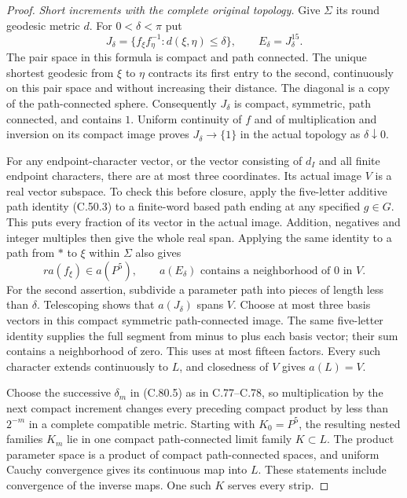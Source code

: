 \begin{proof}
\emph{Short increments with the complete original topology.}
Give $\Sigma$ its round geodesic metric $d$.
For $0<\delta<\pi$ put
\[
 J_\delta=
 \{f_\xi f_\eta^{-1}:d(\xi,\eta)\leq\delta\},
 \qquad E_\delta=J_\delta^{15}.
                                                               \tag{C.80.5}
\]
The pair space in this formula is compact and
path connected. The unique shortest geodesic
from $\xi$ to $\eta$ contracts its first entry
to the second, continuously on this pair space
and without increasing their distance. The
diagonal is a copy of the path-connected sphere.
Consequently $J_\delta$ is compact, symmetric,
path connected, and contains $1$. Uniform
continuity of $f$ and of multiplication and
inversion on its compact image proves
$J_\delta\to\{1\}$ in the actual topology as
$\delta\downarrow0$.

For any endpoint-character vector, or the
vector consisting of $d_I$ and all finite
endpoint characters, there are at most three
coordinates. Its actual image $V$ is a real
vector subspace. To check this before closure,
apply the five-letter additive path identity
(C.50.3) to a finite-word based path ending
at any specified $g\in G$. This puts every
fraction of its vector in the actual image.
Addition, negatives and integer multiples
then give the whole real span. Applying the
same identity to a path from $*$ to $\xi$
within $\Sigma$ also gives
\[
 r a(f_\xi)\in a(P^5),\qquad
 a(E_\delta)\text{ contains a neighborhood of }0
                          \text{ in }V.
                                                               \tag{C.80.6}
\]
For the second assertion, subdivide a parameter
path into pieces of length less than $\delta$.
Telescoping shows that $a(J_\delta)$ spans $V$.
Choose at most three basis vectors in this
compact symmetric path-connected image. The
same five-letter identity supplies the full
segment from minus to plus each basis vector;
their sum contains a neighborhood of zero.
This uses at most fifteen factors. Every such
character extends continuously to $L$, and
closedness of $V$ gives $a(L)=V$.

Choose the successive $\delta_m$ in (C.80.5)
as in C.77--C.78, so multiplication by the
next compact increment changes every preceding
compact product by less than $2^{-m}$ in a
complete compatible metric. Starting with
$K_0=P^5$, the resulting nested families
$K_m$ lie in one compact path-connected limit
family $K\subset L$. The product parameter
space is a product of compact path-connected
spaces, and uniform Cauchy convergence gives
its continuous map into $L$. These statements
include convergence of the inverse maps.
One such $K$ serves every strip.


\end{proof}
